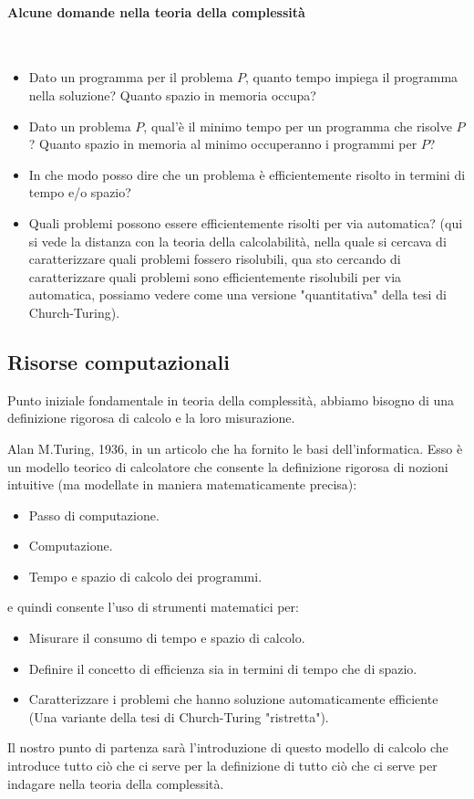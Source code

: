\documentclass{article}
\begin{document}
\paragraph{Alcune domande nella teoria della complessità}\mbox{}\\
\begin{itemize}
    \item Dato un programma per il problema $P$, quanto tempo impiega
          il programma nella soluzione? Quanto spazio in memoria occupa?

    \item Dato un problema $P$, qual'è il minimo tempo per
          un programma che risolve $P$? Quanto spazio in memoria
          al minimo occuperanno i programmi per $P$?

    \item In che modo posso dire che un problema è efficientemente
          risolto in termini di tempo e/o spazio?

    \item Quali problemi possono essere efficientemente risolti per
          via automatica? (qui si vede la distanza con la teoria della
          calcolabilità, nella quale si cercava di caratterizzare
          quali problemi fossero risolubili, qua sto cercando di caratterizzare
          quali problemi sono efficientemente risolubili per via automatica,
          possiamo vedere come una versione "quantitativa" della tesi di
          Church-Turing).
\end{itemize}

\subsection{Risorse computazionali}
Punto iniziale fondamentale in teoria della complessità, abbiamo bisogno
di una definizione rigorosa di calcolo e la loro misurazione.

Alan M.Turing, 1936, in un articolo che ha fornito le basi dell'informatica.
Esso è un modello teorico di calcolatore che consente la definizione
rigorosa di nozioni intuitive (ma modellate in maniera matematicamente
precisa):
\begin{itemize}
    \item Passo di computazione.
    \item Computazione.
    \item Tempo e spazio di calcolo dei programmi.
\end{itemize}
e quindi consente l'uso di strumenti matematici per:
\begin{itemize}
    \item Misurare il consumo di tempo e spazio di calcolo.
    \item Definire il concetto di efficienza sia in termini di tempo
          che di spazio.
    \item Caratterizzare i problemi che hanno soluzione automaticamente
          efficiente (Una variante della tesi di Church-Turing "ristretta").
\end{itemize}
Il nostro punto di partenza sarà l'introduzione di questo modello di calcolo
che introduce tutto ciò che ci serve per la definizione di tutto ciò che
ci serve per indagare nella teoria della complessità.
\end{document}
